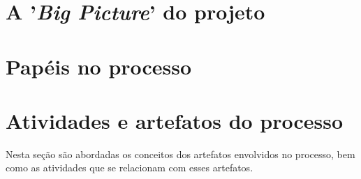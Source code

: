   \pagebreak
  \section{A '\textit{Big Picture}' do projeto}

      
    
  \pagebreak
  \section{Papéis no processo}
    
    
    
  \pagebreak
  \section{Atividades e artefatos do processo}
    
    Nesta seção são abordadas os conceitos dos artefatos envolvidos no processo, bem como as atividades que se relacionam com
    esses artefatos.
    
    
	